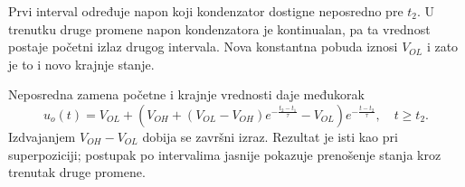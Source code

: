Prvi interval određuje napon koji kondenzator dostigne neposredno pre $t_2$. U trenutku druge promene napon kondenzatora je kontinualan, pa ta vrednost postaje početni izlaz drugog intervala. Nova konstantna pobuda iznosi $V_{OL}$ i zato je to i novo krajnje stanje.

Neposredna zamena početne i krajnje vrednosti daje međukorak
\[u_o(t)=V_{OL}+\left(V_{OH}+(V_{OL}-V_{OH})e^{-\frac{t_2-t_1}{\tau}}-V_{OL}\right)e^{-\frac{t-t_2}{\tau}},\quad t\geq t_2.\]
Izdvajanjem $V_{OH}-V_{OL}$ dobija se završni izraz. Rezultat je isti kao pri superpoziciji; postupak po intervalima jasnije pokazuje prenošenje stanja kroz trenutak druge promene.
